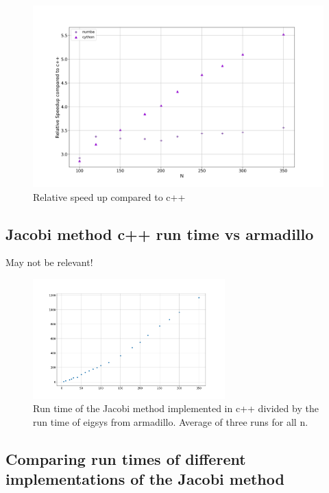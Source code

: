 \begin{figure}[H]
  \centering
  \includegraphics[width=1.0\textwidth]{../figures/speedCompC++_100_350.png}
  \caption{Relative speed up compared to c++}
  \label{fig:comp_c++}
\end{figure}

\subsection{Jacobi method c++ run time vs armadillo}
May not be relevant!

\begin{figure}[H]
  \centering
  \includegraphics[width=0.66\textwidth]{../figures/compare_arma_cpp.png}

  \caption{Run time of the Jacobi method implemented in c++ divided by the run time of eigsys
  from armadillo. Average of three runs for all n.}

  \label{fig:cpp_arma}
\end{figure}




\subsection{Comparing run times of different implementations of the Jacobi method}
